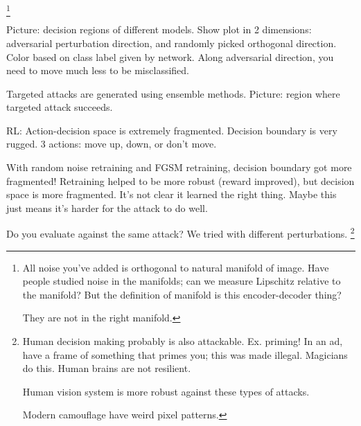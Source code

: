 
\footnote{All noise you've added is orthogonal to natural manifold of image. Have people studied noise in the manifolds; can we measure Lipschitz relative to the manifold? But the definition of manifold is this encoder-decoder thing?

They are not in the right manifold.
}

Picture: decision regions of different models.
Show plot in 2 dimensions: adversarial perturbation direction, and randomly picked orthogonal direction.
Color based on class label given by network. Along adversarial direction, you need to move much less to be misclassified.


Targeted attacks are generated using ensemble methods. Picture: region where targeted attack succeeds.

RL: Action-decision space is extremely fragmented. 
Decision boundary is very rugged. 3 actions: move up, down, or don't move.

With random noise retraining and FGSM retraining, decision boundary got more fragmented! Retraining helped to be more robust (reward improved), but decision space is more fragmented. It's not clear it learned the right thing. Maybe this just means it's harder for the attack to do well.

Do you evaluate against the same attack? 
We tried with different perturbations.
\footnote{Human decision making probably is also attackable. %
Ex. priming! In an ad, have a frame of something that primes you; this was made illegal.
Magicians do this. 
Human brains are not resilient.

Human vision system is more robust against these types of attacks.

Modern camouflage have weird pixel patterns.}

